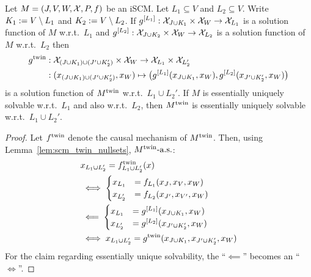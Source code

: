 \begin{Lem}\label{lem:partial_sol_fns_twin_scm}
Let $M = \left ( J, V, W, \mathcal{X}, P, f \right )$ be an iSCM.
Let $L_1 \subseteq V$ and $L_2 \subseteq V$. 
Write $K_1 := V \setminus L_1$ and $K_2 := V \setminus L_2$.
If $g^{[L_1]} : \mathcal{X}_{J \cup K_1} \times \mathcal{X}_W \to \mathcal{X}_{L_1}$ is a solution function of $M$ w.r.t.\ $L_1$
and $g^{[L_2]} : \mathcal{X}_{J \cup K_2} \times \mathcal{X}_W \to \mathcal{X}_{L_2}$ is a solution function of $M$ w.r.t.\ $L_2$
then
  \begin{equation*}\begin{split}
    g^{\mathrm{twin}} & : \mathcal{X}_{(J \cup K_1) \cup (J' \cup K_2')} \times \mathcal{X}_W \to \mathcal{X}_{L_1} \times \mathcal{X}_{L_2'} \\
    & : (x_{(J \cup K_1) \cup (J' \cup K_2')}, x_W) \mapsto \big(g^{[L_1]}(x_{J \cup K_1},x_W),g^{[L_2]}(x_{J' \cup K_2'},x_W)\big) 
  \end{split}\end{equation*}
is a solution function of $M^{\mathrm{twin}}$ w.r.t.\ $L_1 \cup L_2'$.
If $M$ is essentially uniquely solvable w.r.t.\ $L_1$ and also w.r.t.\ $L_2$, then $M^{\mathrm{twin}}$ is essentially uniquely solvable w.r.t.\ $L_1 \cup L_2'$.
\end{Lem}
\begin{proof}
Let $f^{\mathrm{twin}}$ denote the causal mechanism of $M^{\mathrm{twin}}$.
Then, using Lemma~\ref{lem:scm_twin_nullsets}, $M^{\mathrm{twin}}\text{-a.s.}$:
  \begin{equation*}\begin{split}
    & x_{L_1 \cup L_2'} = f^{\mathrm{twin}}_{L_1 \cup L_2'}(x) \\
    & \iff \begin{cases}
      x_{L_1}  &= f_{L_1}(x_J,x_V,x_W) \\
      x_{L_2'} &= f_{L_2}(x_{J'},x_{V'},x_W)
    \end{cases} \\
    & \impliedby \begin{cases}
      x_{L_1} &= g^{[L_1]}(x_{J\cup K_1},x_W) \\
      x_{L_2'} &= g^{[L_2]}(x_{J'\cup K_2'},x_W)
    \end{cases}\\
    & \iff 
    x_{L_1 \cup L_2'} = g^{\mathrm{twin}}(x_{J \cup K_1}, x_{J' \cup K_2'}, x_W)
  \end{split}\end{equation*}
For the claim regarding essentially unique solvability, the ``$\impliedby$'' becomes an ``$\iff$''.
\end{proof}

